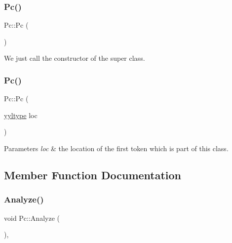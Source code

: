 \subsubsection{\texorpdfstring{Pc()}{Pc()}\hspace{0.1cm}{\footnotesize\ttfamily [1/2]}}
{\footnotesize\ttfamily Pc\+::\+Pc (\begin{DoxyParamCaption}{ }\end{DoxyParamCaption})\hspace{0.3cm}{\ttfamily [inline]}}

We just call the constructor of the super class. \mbox{\label{class_pc_a9cda0e0530fc008372c70ff09532ea48}} 
\subsubsection{\texorpdfstring{Pc()}{Pc()}\hspace{0.1cm}{\footnotesize\ttfamily [2/2]}}
{\footnotesize\ttfamily Pc\+::\+Pc (\begin{DoxyParamCaption}\item[{\hyperlink{structyyltype}{yyltype}}]{loc }\end{DoxyParamCaption})\hspace{0.3cm}{\ttfamily [inline]}}


\begin{DoxyParams}{Parameters}
{\em loc} & the location of the first token which is part of this class. \\
\hline
\end{DoxyParams}


\subsection{Member Function Documentation}
\mbox{\label{class_pc_a8376e5338c6f9c37363f1012722efef9}} 
\subsubsection{\texorpdfstring{Analyze()}{Analyze()}}
{\footnotesize\ttfamily void Pc\+::\+Analyze (\begin{DoxyParamCaption}{ }\end{DoxyParamCaption})\hspace{0.3cm}{\ttfamily [inline]}, {\ttfamily [virtual]}}

